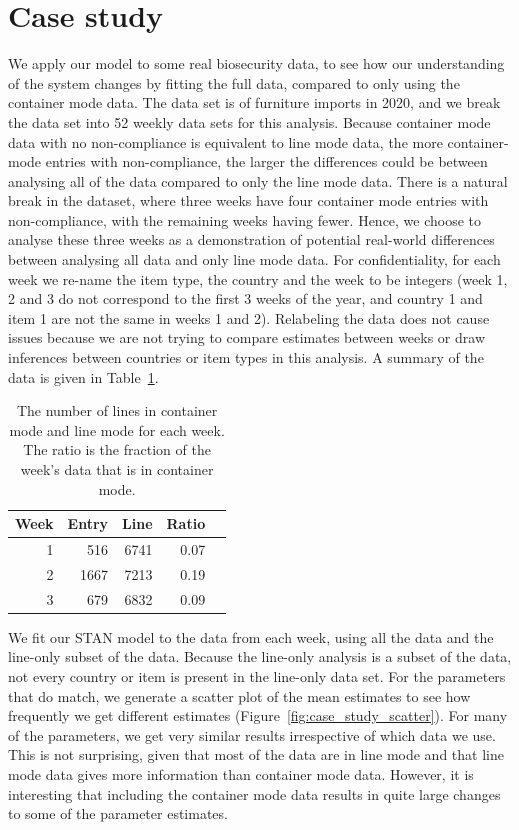\documentclass[useAMS,usenatbib,referee]{biom}
\begin{document}
\section{Case study}
We apply our model to some real biosecurity data, to see how our understanding of the system changes by fitting the full data, compared to only using the container mode data. The data set is of furniture imports in 2020, and we break the data set into 52 weekly data sets for this analysis. Because container mode data with no non-compliance is equivalent to line mode data, the more container-mode entries with non-compliance, the larger the differences could be between analysing all of the data compared to only the line mode data. There is a natural break in the dataset, where three weeks have four container mode entries with non-compliance, with the remaining weeks having fewer. Hence, we choose to analyse these three weeks as a demonstration of potential real-world differences between analysing all data and only line mode data. For confidentiality, for each week we re-name the item type, the country and the week to be integers (week 1, 2 and 3 do not correspond to the first 3 weeks of the year, and country 1 and item 1 are not the same in weeks 1 and 2). Relabeling the data does not cause issues because we are not trying to compare estimates between weeks or draw inferences between countries or item types in this analysis. A summary of the data is given in Table~\ref{tab:real_data_summary}.

\begin{table}[ht]
\caption{The number of lines in container mode and line mode for each week. The ratio is the fraction of the week's data that is in container mode.}
\label{tab:real_data_summary}
\centering
\begin{tabular}{rrrrr}
  \hline
 Week & Entry & Line & Ratio  \\ 
  \hline
 1 & 516 & 6741 & 0.07 \\ 
  2 & 1667 & 7213 & 0.19 \\ 
   3 & 679 & 6832 & 0.09 \\ 
   \hline
\end{tabular}
\end{table}


We fit our STAN model to the data from each week, using all the data and the line-only subset of the data. Because the line-only analysis is a subset of the data, not every country or item is present in the line-only data set. For the parameters that do match, we generate a scatter plot of the mean estimates to see how frequently we get different estimates (Figure~\ref{fig:case_study_scatter}). For many of the parameters, we get very similar results irrespective of which data we use. This is not surprising, given that most of the data are in line mode and that line mode data gives more information than container mode data. However, it is interesting that including the container mode data results in quite large changes to some of the parameter estimates. 
\end{document}
